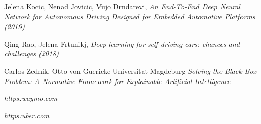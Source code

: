 \begin{thebibliography}{9}
Jelena Kocic, Nenad Jovicic, Vujo Drndarevi, \textit{An End-To-End Deep Neural Network for Autonomous Driving Designed for Embedded Automotive Platforms (2019)}

Qing Rao, Jelena Frtunikj, \textit{Deep learning for self-driving cars: chances and challenges (2018)}

Carlos Zednik, Otto-von-Guericke-Universitat Magdeburg \textit{Solving the Black Box Problem: A Normative Framework for Explainable Artificial Intelligence}

\textit{https:\/\/waymo.com\/}

\textit{https:\/\/uber.com\/}

\end{thebibliography}